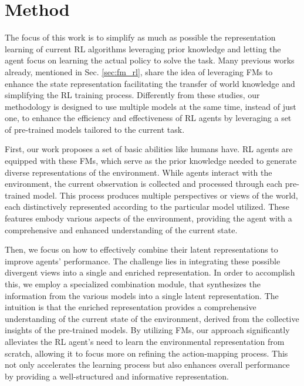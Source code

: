 
\chapter{Method}
\label{sec:method}
The focus of this work is to simplify as much as possible the representation learning of current RL algorithms leveraging prior knowledge and letting the agent focus on learning the actual policy to solve the task.
Many previous works already, mentioned in Sec. \ref{sec:fm_rl}, share the idea of leveraging FMs to enhance the state representation facilitating the transfer of world knowledge and simplifying the RL training process.
Differently from these studies, our methodology is designed to use multiple models at the same time, instead of just one, to enhance the efficiency and effectiveness of RL agents by leveraging a set of pre-trained models tailored to the current task.

First, our work proposes a set of basic abilities like humans have.
RL agents are equipped with these FMs, which serve as the prior knowledge needed to generate diverse representations of the environment.
While agents interact with the environment, the current observation is collected and processed through each pre-trained model.
This process produces multiple perspectives or views of the world, each distinctively represented according to the particular model utilized.
These features embody various aspects of the environment, providing the agent with a comprehensive and enhanced understanding of the current state.

Then, we focus on how to effectively combine their latent representations to improve agents' performance.
The challenge lies in integrating these possible divergent views into a single and enriched representation.
In order to accomplish this, we employ a specialized combination module, that synthesizes the information from the various models into a single latent representation.
The intuition is that the enriched representation provides a comprehensive understanding of the current state of the environment, derived from the collective insights of the pre-trained models.
By utilizing FMs, our approach significantly alleviates the RL agent's need to learn the environmental representation from scratch, allowing it to focus more on refining the action-mapping process.
This not only accelerates the learning process but also enhances overall performance by providing a well-structured and informative representation.

